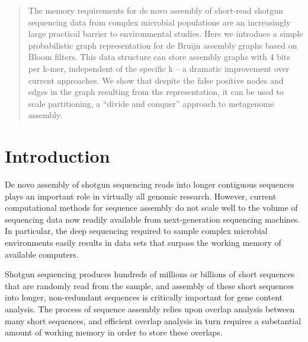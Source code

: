 \documentclass{pnastwo}
\begin{document}
\begin{article}

\begin{abstract}

The memory requirements for de novo assembly of short-read shotgun
sequencing data from complex microbial populations are an increasingly
large practical barrier to environmental studies.  Here we introduce a
simple probabilistic graph representation for de Bruijn assembly
graphs based on Bloom filters.  This data structure can store assembly
graphs with 4 bits per k-mer, independent of the specific k -- a
dramatic improvement over current approaches.  We show that despite
the false positive nodes and edges in the graph resulting from the
representation, it can be used to scale partitioning, a ``divide and
conquer'' approach to metagenome assembly.

\end{abstract}


\section{Introduction}

De novo assembly of shotgun sequencing reads into longer contiguous
sequences plays an important role in virtually all genomic research.
However, current computational methods for sequence assembly do not
scale well to the volume of sequencing data now readily available from
next-generation sequencing machines.  In particular, the deep
sequencing required to sample complex microbial environments easily
results in data sets that surpass the working memory of available
computers.

Shotgun sequencing produces hundreds of millions or billions of short
sequences that are randomly read from the sample, and assembly of
these short sequences into longer, non-redundant sequences is
critically important for gene content analysis.  The process of
sequence assembly relies upon overlap analysis between many short
sequences, and efficient overlap analysis in turn requires a
substantial amount of working memory in order to store these overlaps.


\end{article}
\end{document}
